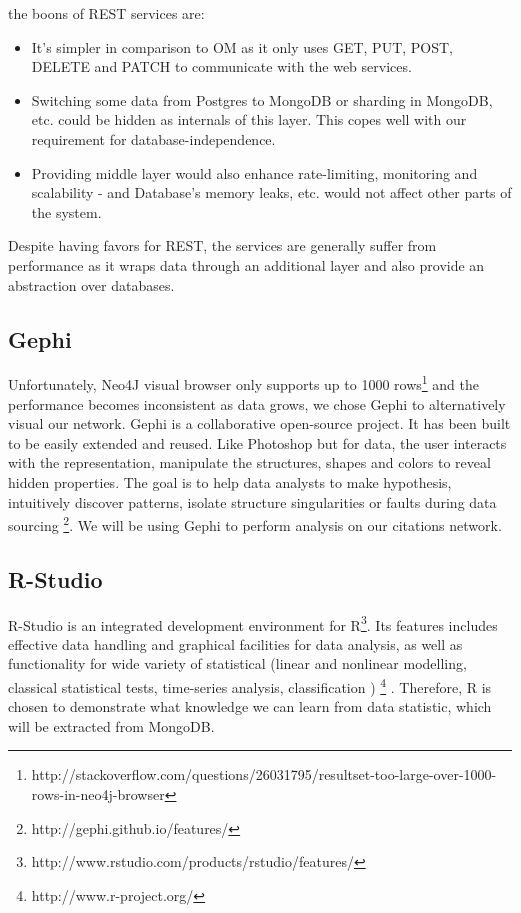 \documentclass{sig-alternate}
\begin{document}
{the boons of REST services are:
\begin{itemize}
\item It's simpler in comparison to OM as it only uses GET, PUT, POST, DELETE and PATCH to communicate with the web services.
\item  Switching some data from Postgres to MongoDB or sharding in MongoDB, etc. could be hidden as internals of this layer. This copes well with our requirement for database-independence.
\item Providing middle layer would also enhance rate-limiting, monitoring and scalability - and Database's memory leaks, etc. would not affect other parts of the system.
\end{itemize}

Despite having favors for REST, the services are generally suffer from performance as it wraps data through an additional layer and also provide an abstraction over databases.
\subsection{Gephi}
Unfortunately, Neo4J visual browser only supports up to 1000 rows\footnote{http://stackoverflow.com/questions/26031795/resultset-too-large-over-1000-rows-in-neo4j-browser} and the performance becomes inconsistent as data grows, we chose Gephi to alternatively visual our network. Gephi is a collaborative open-source project. It has been built to be easily extended and reused. Like Photoshop but for data, the user interacts with the representation, manipulate the structures, shapes and colors to reveal hidden properties. The goal is to help data analysts to make hypothesis, intuitively discover patterns, isolate structure singularities or faults during data sourcing \footnote{http://gephi.github.io/features/}. We will be using Gephi to perform analysis on our citations network.

\subsection{R-Studio}

R-Studio is an integrated development  environment for R\footnote{http://www.rstudio.com/products/rstudio/features/}. Its features includes effective data handling and graphical facilities for data analysis, as well as functionality for wide variety of statistical (linear and nonlinear modelling, classical statistical tests, time-series analysis, classification ) \footnote{http://www.r-project.org/} . Therefore, R is chosen to demonstrate what knowledge we can learn from data statistic, which will be extracted from MongoDB.

}
\end{document}
